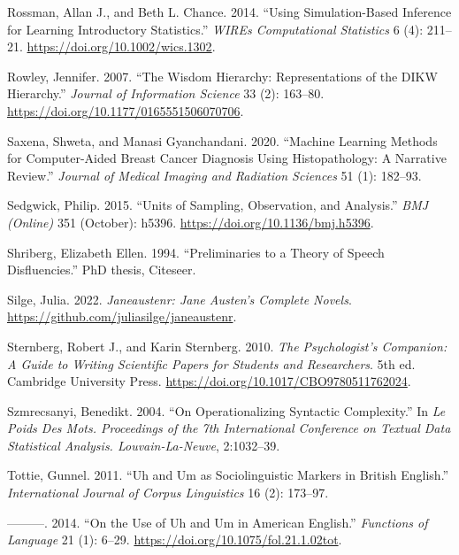 \documentclass[
  letterpaper,
]{latex/krantz}
\newlength{\cslhangindent}
\newenvironment{CSLReferences}[2] %
 {\begin{list}{}{%
  \setlength{\itemindent}{0pt}
  \setlength{\leftmargin}{0pt}
  \setlength{\parsep}{0pt}
  \ifodd #1
   \setlength{\leftmargin}{\cslhangindent}
   \setlength{\itemindent}{-1\cslhangindent}
  \fi
  \setlength{\itemsep}{#2\baselineskip}}}
 {\end{list}}
\theoremstyle{definition}
\theoremstyle{remark}
\begin{document}
\begin{CSLReferences}{1}{0}
Rossman, Allan J., and Beth L. Chance. 2014. {``Using Simulation-Based
Inference for Learning Introductory Statistics.''} \emph{WIREs
Computational Statistics} 6 (4): 211--21.
\url{https://doi.org/10.1002/wics.1302}.

Rowley, Jennifer. 2007. {``The Wisdom Hierarchy: Representations of the
DIKW Hierarchy.''} \emph{Journal of Information Science} 33 (2):
163--80. \url{https://doi.org/10.1177/0165551506070706}.

Saxena, Shweta, and Manasi Gyanchandani. 2020. {``Machine Learning
Methods for Computer-Aided Breast Cancer Diagnosis Using Histopathology:
A Narrative Review.''} \emph{Journal of Medical Imaging and Radiation
Sciences} 51 (1): 182--93.

Sedgwick, Philip. 2015. {``Units of Sampling, Observation, and
Analysis.''} \emph{BMJ (Online)} 351 (October): h5396.
\url{https://doi.org/10.1136/bmj.h5396}.

Shriberg, Elizabeth Ellen. 1994. {``Preliminaries to a Theory of Speech
Disfluencies.''} PhD thesis, Citeseer.

Silge, Julia. 2022. \emph{Janeaustenr: Jane Austen's Complete Novels}.
\url{https://github.com/juliasilge/janeaustenr}.

Sternberg, Robert J., and Karin Sternberg. 2010. \emph{The
Psychologist's Companion: A Guide to Writing Scientific Papers for
Students and Researchers}. 5th ed. Cambridge University Press.
\url{https://doi.org/10.1017/CBO9780511762024}.

Szmrecsanyi, Benedikt. 2004. {``On Operationalizing Syntactic
Complexity.''} In \emph{Le Poids Des Mots. Proceedings of the 7th
International Conference on Textual Data Statistical Analysis.
Louvain-La-Neuve}, 2:1032--39.

Tottie, Gunnel. 2011. {``Uh and Um as Sociolinguistic Markers in British
English.''} \emph{International Journal of Corpus Linguistics} 16 (2):
173--97.

---------. 2014. {``On the Use of Uh and Um in American English.''}
\emph{Functions of Language} 21 (1): 6--29.
\url{https://doi.org/10.1075/fol.21.1.02tot}.


\end{CSLReferences}
\end{document}
